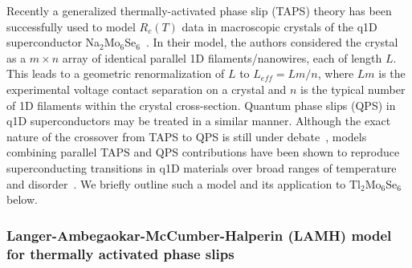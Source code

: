 \documentclass[prb,twocolumn,showpacs,preprintnumbers,amsmath,amssymb,floatfix,groupedaddress,superscriptaddress,aps,10pt]{revtex4-1}
\newcommand{\Tl}{Tl$_2$Mo$_6$Se$_6$}
\begin{document}
{{Recently a generalized thermally-activated phase slip (TAPS) theory has been successfully used to model $R_c(T)$ data in macroscopic crystals of the q1D superconductor Na$_2$Mo$_6$Se$_6$~\cite{Ansermet2016}. In their model, the authors considered the crystal as a $m \times n$ array of identical parallel 1D filaments/nanowires, each of length $L$. This leads to a geometric renormalization of $L$ to $L_{eff}=Lm/n$, where $Lm$ is the experimental voltage contact separation on a crystal and $n$ is the typical number of 1D filaments within the crystal cross-section.  Quantum phase slips (QPS) in q1D superconductors may be treated in a similar manner.  Although the exact nature of the crossover from TAPS to QPS is still under debate~\cite{Tian2005,Arutyunov2008}, models combining parallel TAPS and QPS contributions have been shown to reproduce superconducting transitions in q1D materials over broad ranges of temperature and disorder~\cite{Petrovic2016,Zhang2017}. We briefly outline such a model and its application to {\Tl} below.
  
\subsubsection{Langer-Ambegaokar-McCumber-Halperin (LAMH) model for thermally activated phase slips}

}}
\end{document}
